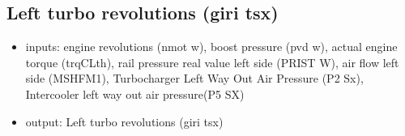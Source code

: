 

\subsection{Left turbo revolutions (giri tsx)}
\begin{itemize}
	\item{inputs: engine revolutions (nmot w), boost pressure (pvd w), actual engine torque (trqCLth), rail pressure real value left side (PRIST W), air flow left side (MSHFM1), Turbocharger Left Way Out Air Pressure (P2 Sx), Intercooler left way out air pressure(P5 SX)}
	\item{output: Left turbo revolutions (giri tsx)}
\end{itemize}	









